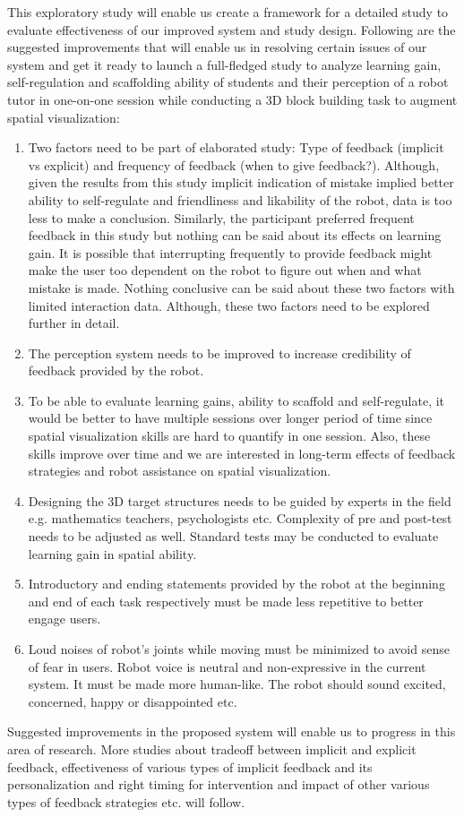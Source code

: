 This exploratory study will enable us create a framework for a detailed study to evaluate effectiveness of our improved system and study design. Following are the suggested improvements that will enable us in resolving certain issues of our system and get it ready to launch a full-fledged study to analyze learning gain, self-regulation and scaffolding ability of students and their perception of a robot tutor in one-on-one session while conducting a 3D block building task to augment spatial visualization:
\begin{enumerate}
    \item Two factors need to be part of elaborated study: Type of feedback (implicit vs explicit) and frequency of feedback (when to give feedback?). Although, given the results from this study implicit indication of mistake implied better ability to self-regulate and friendliness and likability of the robot, data is too less to make a conclusion. Similarly, the participant preferred frequent feedback in this study but nothing can be said about its effects on learning gain. It is possible that interrupting frequently to provide feedback might make the user too dependent on the robot to figure out when and what mistake is made. Nothing conclusive can be said about these two factors with limited interaction data. Although, these two factors need to be explored further in detail. 
    \item The perception system needs to be improved to increase credibility of feedback provided by the robot.
    \item To be able to evaluate learning gains, ability to scaffold and self-regulate, it would be better to have multiple sessions over longer period of time since spatial visualization skills are hard to quantify in one session. Also, these skills improve over time and we are interested in long-term effects of feedback strategies and robot assistance on spatial visualization. 
    \item Designing the 3D target structures needs to be guided by experts in the field e.g. mathematics teachers, psychologists etc. Complexity of pre and post-test needs to be adjusted as well. Standard tests may be conducted to evaluate learning gain in spatial ability. 
    \item Introductory and ending statements provided by the robot at the beginning and end of each task respectively must be made less repetitive to better engage users.  
    \item Loud noises of robot's joints while moving must be minimized to avoid sense of fear in users. Robot voice is neutral and non-expressive in the current system. It must be made more human-like. The robot should sound excited, concerned, happy or disappointed etc. 
\end{enumerate}
Suggested improvements in the proposed system will enable us to progress in this area of research. More studies about trade\-off between implicit and explicit feedback, effectiveness of various types of implicit feedback and its personalization and right timing for intervention and impact of other various types of feedback strategies etc. will follow.

